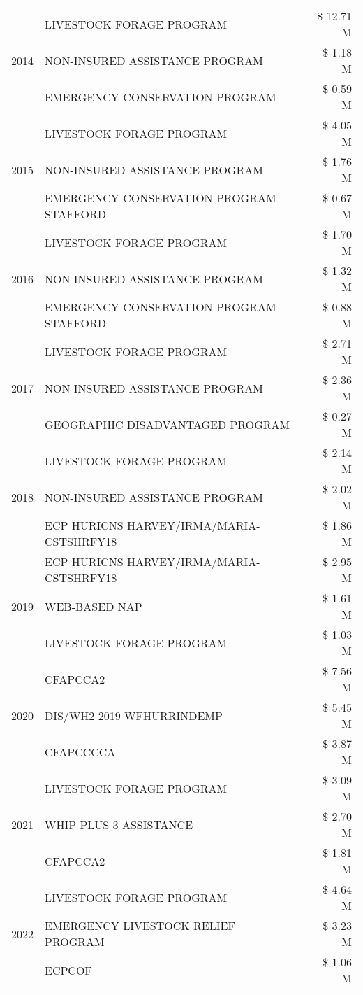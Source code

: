 \begin{tabular}{llr}
\cline{1-3}
\multirow[t]{3}{*}{2014} & LIVESTOCK FORAGE PROGRAM & \$ 12.71 M \\
 & NON-INSURED ASSISTANCE PROGRAM & \$ 1.18 M \\
 & EMERGENCY CONSERVATION PROGRAM & \$ 0.59 M \\
\cline{1-3}
\multirow[t]{3}{*}{2015} & LIVESTOCK FORAGE PROGRAM & \$ 4.05 M \\
 & NON-INSURED ASSISTANCE PROGRAM & \$ 1.76 M \\
 & EMERGENCY CONSERVATION PROGRAM STAFFORD & \$ 0.67 M \\
\cline{1-3}
\multirow[t]{3}{*}{2016} & LIVESTOCK FORAGE PROGRAM & \$ 1.70 M \\
 & NON-INSURED ASSISTANCE PROGRAM & \$ 1.32 M \\
 & EMERGENCY CONSERVATION PROGRAM STAFFORD & \$ 0.88 M \\
\cline{1-3}
\multirow[t]{3}{*}{2017} & LIVESTOCK FORAGE PROGRAM & \$ 2.71 M \\
 & NON-INSURED ASSISTANCE PROGRAM & \$ 2.36 M \\
 & GEOGRAPHIC DISADVANTAGED PROGRAM & \$ 0.27 M \\
\cline{1-3}
\multirow[t]{3}{*}{2018} & LIVESTOCK FORAGE PROGRAM & \$ 2.14 M \\
 & NON-INSURED ASSISTANCE PROGRAM & \$ 2.02 M \\
 & ECP HURICNS HARVEY/IRMA/MARIA-CSTSHRFY18 & \$ 1.86 M \\
\cline{1-3}
\multirow[t]{3}{*}{2019} & ECP HURICNS HARVEY/IRMA/MARIA-CSTSHRFY18 & \$ 2.95 M \\
 & WEB-BASED NAP & \$ 1.61 M \\
 & LIVESTOCK FORAGE PROGRAM & \$ 1.03 M \\
\cline{1-3}
\multirow[t]{3}{*}{2020} & CFAPCCA2 & \$ 7.56 M \\
 & DIS/WH2 2019 WFHURRINDEMP & \$ 5.45 M \\
 & CFAPCCCCA & \$ 3.87 M \\
\cline{1-3}
\multirow[t]{3}{*}{2021} & LIVESTOCK FORAGE PROGRAM & \$ 3.09 M \\
 & WHIP PLUS 3 ASSISTANCE & \$ 2.70 M \\
 & CFAPCCA2 & \$ 1.81 M \\
\cline{1-3}
\multirow[t]{3}{*}{2022} & LIVESTOCK FORAGE PROGRAM & \$ 4.64 M \\
 & EMERGENCY LIVESTOCK RELIEF PROGRAM & \$ 3.23 M \\
 & ECPCOF & \$ 1.06 M \\
\cline{1-3}
\bottomrule
\end{tabular}
